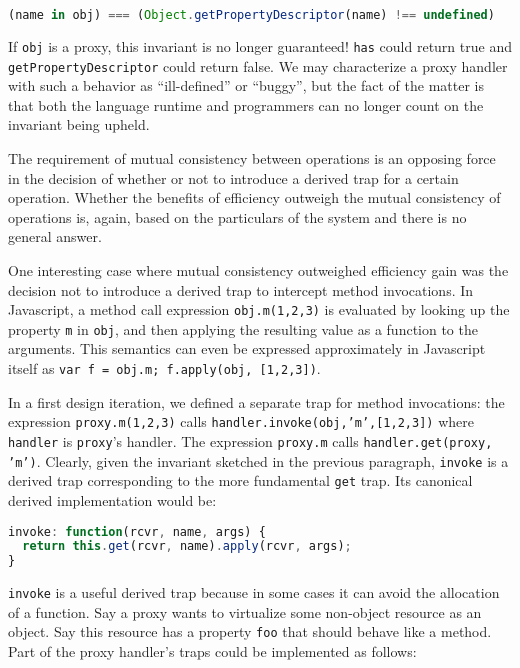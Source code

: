 \documentclass{acm_proc_article-sp}
\begin{document}
\begin{lstlisting}[language=javascript]
(name in obj) === (Object.getPropertyDescriptor(name) !== undefined)
\end{lstlisting}

If \texttt{obj} is a proxy, this invariant is no longer guaranteed! \texttt{has} could return true and \texttt{getPropertyDescriptor} could return false. We may characterize a proxy handler with such a behavior as ``ill-defined'' or ``buggy'', but the fact of the matter is that both the language runtime and programmers can no longer count on the invariant being upheld.

The requirement of mutual consistency between operations is an opposing force in the decision of whether or not to introduce a derived trap for a certain operation. Whether the benefits of efficiency outweigh the mutual consistency of operations is, again, based on the particulars of the system and there is no general answer.

One interesting case where mutual consistency outweighed efficiency gain was the decision not to introduce a derived trap to intercept method invocations. In Javascript, a method call expression \texttt{obj.m(1,2,3)} is evaluated by looking up the property \texttt{m} in \texttt{obj}, and then applying the resulting value as a function to the arguments. This semantics can even be expressed approximately in Javascript itself as \texttt{var f = obj.m; f.apply(obj, [1,2,3])}.

In a first design iteration, we defined a separate trap for method invocations: the expression \texttt{proxy.m(1,2,3)} calls \texttt{handler.invoke(obj,'m',[1,2,3])} where \texttt{handler} is \texttt{proxy}'s handler. The expression \texttt{proxy.m} calls \texttt{handler.get(proxy, 'm')}. Clearly, given the invariant sketched in the previous paragraph, \texttt{invoke} is a derived trap corresponding to the more fundamental \texttt{get} trap. Its canonical derived implementation would be:

\begin{lstlisting}[language=javascript]
invoke: function(rcvr, name, args) {
  return this.get(rcvr, name).apply(rcvr, args);
}
\end{lstlisting}

\texttt{invoke} is a useful derived trap because in some cases it can avoid the allocation of a function. Say a proxy wants to virtualize some non-object resource as an object. Say this resource has a property \texttt{foo} that should behave like a method. Part of the proxy handler's traps could be implemented as follows:
\end{document}

